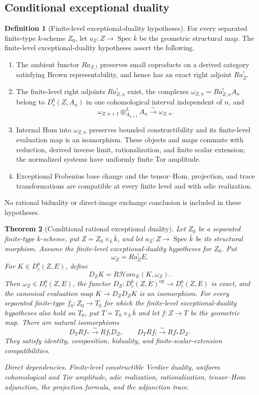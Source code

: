 \documentclass[10pt]{article}
\newtheorem{theorem}{Theorem}[section]
\theoremstyle{definition}
\newtheorem{definition}[theorem]{Definition}
\newcommand{\Dbc}{D^b_c}
\newcommand{\Spec}{\operatorname{Spec}}
\newcommand{\dep}[1]{\par\smallskip\noindent\textit{Direct dependencies.} #1\par}
\begin{document}
\subsection{Conditional exceptional duality}

\begin{definition}[Finite-level exceptional-duality hypotheses]
For every separated finite-type \(k\)-scheme \(Z_0\), let
\(a_Z:Z\to\Spec\bar k\) be the geometric structural map.  The finite-level exceptional-duality
hypotheses assert the following.
\begin{enumerate}[label=\textup{(\roman*)}]
\item The ambient functor \(Ra_{Z,!}\) preserves small coproducts on a
derived category satisfying Brown representability, and hence has an exact
right adjoint \(Ra_Z^!\).
\item The finite-level right adjoints \(Ra_{Z,n}^!\) exist, the complexes
\(\omega_{Z,n}=Ra_{Z,n}^!A_n\) belong to \(D^b_c(Z,A_n)\) in one
cohomological interval independent of \(n\), and
\[
 \omega_{Z,n+1}\otimes^L_{A_{n+1}}A_n
                    \xrightarrow{\sim}\omega_{Z,n}.
\]
\item Internal Hom into \(\omega_{Z,n}\) preserves bounded
constructibility and its finite-level evaluation map is an isomorphism.
These objects and maps commute with reduction, derived inverse limit,
rationalization, and finite scalar extension; the normalized systems have
uniformly finite Tor amplitude.
\item Exceptional Frobenius base change and the tensor--Hom, projection,
and trace transformations are compatible at every finite level and with
adic realization.
\end{enumerate}
No rational biduality or direct-image exchange conclusion is included in
these hypotheses.
\end{definition}

\begin{theorem}[Conditional rational exceptional duality]
Let \(Z_0\) be a separated finite-type \(k\)-scheme, put
\(Z=Z_0\times_k\bar k\), and let
\(a_Z:Z\to\Spec\bar k\) be its structural morphism.  Assume the
finite-level exceptional-duality hypotheses for \(Z_0\).  Put
\[
             \omega_Z=Ra_Z^!E.
\]
For \(K\in\Dbc(Z,E)\), define
\[
                   D_ZK=R\mathcal Hom_E(K,\omega_Z).
\]
Then
\(\omega_Z\in\Dbc(Z,E)\), the functor
\(D_Z:\Dbc(Z,E)^{\mathrm{op}}\to\Dbc(Z,E)\) is exact, and the canonical
evaluation map \(K\to D_ZD_ZK\) is an isomorphism.  For every separated
 finite-type \(f_0:Z_0\to T_0\) for which the finite-level
exceptional-duality hypotheses also hold on \(T_0\), put
\(T=T_0\times_k\bar k\) and let \(f:Z\to T\) be the geometric map.  There
are natural isomorphisms
\[
 D_TRf_*\xrightarrow{\sim}Rf_!D_Z,
 \qquad
 D_TRf_!\xrightarrow{\sim}Rf_*D_Z.
\]
They satisfy identity, composition, biduality, and finite-scalar-extension
compatibilities.
\dep{Finite-level constructible Verdier duality, uniform cohomological and
Tor amplitude, adic realization, rationalization, tensor--Hom adjunction,
the projection formula, and the adjunction trace.}
\end{theorem}
\end{document}
